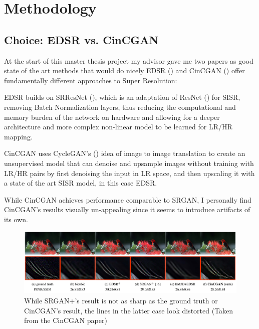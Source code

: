 \chapter{Methodology} %

\label{Chapter3}

\section{Choice: EDSR vs. CinCGAN}

At the start of this master thesis project my advisor gave me two papers as good state of the art methods that would do nicely EDSR (\cite{EDSR}) and CinCGAN (\cite{CinCGAN}) offer fundamentally different approaches to Super Resolution:

\hfill

EDSR builds on SRResNet (\cite{SRGAN}), which is an adaptation of ResNet (\cite{ResNet}) for SISR, removing Batch Normalization layers, thus reducing the computational and memory burden of the network on hardware and allowing for a deeper architecture and more complex non-linear model to be learned for LR/HR mapping. 

\hfill

CinCGAN uses CycleGAN's (\cite{CycleGAN}) idea of image to image translation to create an unsupervised model that can denoise and upsample images without training with LR/HR pairs by first denoising the input in LR space, and then upscaling it with a state of the art SISR model, in this case EDSR.

\hfill

While CinCGAN achieves performance comparable to SRGAN, I personally find CinCGAN's results visually un-appealing since it seems to introduce artifacts of its own.

\hfill

\begin{figure}[H]
\centering
\includegraphics[width=\textwidth]{../Figures/CinCGAN2}
\caption{While SRGAN+'s result is not as sharp as the ground truth or CinCGAN's result, the lines in the latter case look distorted (Taken from the CinCGAN paper)}
\end{figure}

